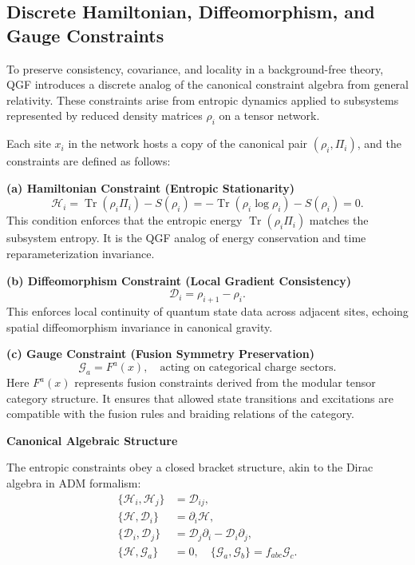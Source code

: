 \documentclass[11pt]{article}
\DeclareMathOperator*{\Tr}{Tr}
\begin{document}
\subsection{Discrete Hamiltonian, Diffeomorphism, and Gauge Constraints}

To preserve consistency, covariance, and locality in a background-free theory, QGF introduces a discrete analog of the canonical constraint algebra from general relativity. These constraints arise from entropic dynamics applied to subsystems represented by reduced density matrices \( \rho_i \) on a tensor network.

Each site \( x_i \) in the network hosts a copy of the canonical pair \( (\rho_i, \Pi_i) \), and the constraints are defined as follows:

\vspace{0.8em}
\noindent\textbf{(a) Hamiltonian Constraint (Entropic Stationarity)}
\[
\mathcal{H}_i = \Tr(\rho_i \Pi_i) - S(\rho_i) = -\Tr(\rho_i \log \rho_i) - S(\rho_i) = 0.
\]
This condition enforces that the entropic energy \( \Tr(\rho_i \Pi_i) \) matches the subsystem entropy. It is the QGF analog of energy conservation and time reparameterization invariance.

\vspace{0.8em}
\noindent\textbf{(b) Diffeomorphism Constraint (Local Gradient Consistency)}
\[
\mathcal{D}_i = \rho_{i+1} - \rho_i.
\]
This enforces local continuity of quantum state data across adjacent sites, echoing spatial diffeomorphism invariance in canonical gravity.

\vspace{0.8em}
\noindent\textbf{(c) Gauge Constraint (Fusion Symmetry Preservation)}
\[
\mathcal{G}_a = F^a(x), \quad \text{acting on categorical charge sectors.}
\]
Here \( F^a(x) \) represents fusion constraints derived from the modular tensor category structure. It ensures that allowed state transitions and excitations are compatible with the fusion rules and braiding relations of the category.

\vspace{0.8em}
\noindent\textbf{Canonical Algebraic Structure}

The entropic constraints obey a closed bracket structure, akin to the Dirac algebra in ADM formalism:
\begin{align*}
\{\mathcal{H}_i, \mathcal{H}_j\} &= \mathcal{D}_{ij}, \\
\{\mathcal{H}, \mathcal{D}_i\} &= \partial_i \mathcal{H}, \\
\{\mathcal{D}_i, \mathcal{D}_j\} &= \mathcal{D}_j \partial_i - \mathcal{D}_i \partial_j, \\
\{\mathcal{H}, \mathcal{G}_a\} &= 0, \quad \{\mathcal{G}_a, \mathcal{G}_b\} = f_{abc} \mathcal{G}_c.
\end{align*}
\end{document}
